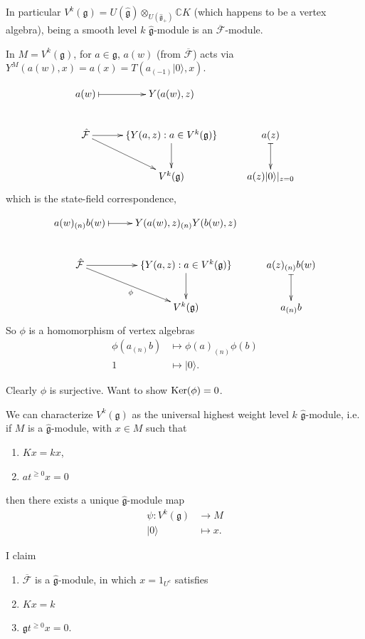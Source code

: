 \medskip\noindent
In particular 
$V^k(\mathfrak{g})
=U(\hat{\mathfrak{g}})\otimes_{U(\hat{\mathfrak{g}}_+)}\mathbb{C}K$ 
(which happens to be a vertex algebra),
being a smooth level $k$ $\hat{\mathfrak{g}}$-module is an
$\overline{\mathcal{F}}$-module.

In $M=V^k(\mathfrak{g})$, for $a \in \mathfrak{g}$,
$a(w)$ (from $\overline{\mathcal{F}}$) acts via 
$Y^M(a(w),x)=a(x)=T(a_{(-1)}|0\rangle,x)$.

$$
\xymatrix{
a(w)\ar@{|->}[r]&Y(a(w),z)\\
\hat{\mathcal{F}}\ar[r]\ar[rd]& \{Y(a,z):a \in V^k(\mathfrak{g})\}
\ar[d]
& a(z)\ar@{|->}[d]\\
&V^k(\mathfrak{g})&a(z)|0\rangle|_{z=0}
}
$$
which is the state-field correspondence,

$$
\xymatrix{
a(w)_{(n)}b(w)\ar@{|->}[r]&Y(a(w),z)_{(n)}Y(b(w),z)\\
\hat{\mathcal{F}}\ar[r]\ar[rd]_\phi& \{Y(a,z):a \in V^k(\mathfrak{g})\}
\ar[d]
& a(z)_{(n)}b(w)\ar@{|->}[d]\\
&V^k(\mathfrak{g})&a_{(n)}b
}
$$
So $\phi$ is a homomorphism of vertex algebras
\begin{align*}
\phi(a_{(n)}b)&\mapsto \phi(a)_{(n)}\phi(b)\\
1 & \mapsto |0\rangle.
\end{align*}

\noindent
Clearly $\phi$ is surjective. Want to show $\mathop{\mathrm{Ker}}(\phi)=0$.

\medskip\noindent
We can characterize $V^k(\mathfrak{g})$ as the universal
highest weight level $k$ $\hat{\mathfrak{g}}$-module,
i.e. if $M$ is a $\hat{\mathfrak{g}}$-module, 
with $x \in M$ such that
\begin{enumerate}
\item $Kx = kx$,
\item $at^{\geq 0}x=0$
\end{enumerate}

\noindent
then there exists a unique $\hat{\mathfrak{g}}$-module map
\begin{align*}
\psi: V^k(\mathfrak{g}) &\longrightarrow M \\
|0\rangle &\longmapsto x.
\end{align*}

\begin{lemma}
\label{lemma-f-ghat-module}
I claim 
\begin{enumerate}
\item $\overline{\mathcal{F}}$ is a $\hat{\mathfrak{g}}$-module,
in which $x=1_{U^c}$ satisfies
\item $Kx=k$ 
\item $\mathfrak{g}t^{\geq 0}x=0$.
\end{enumerate}
\end{lemma}

